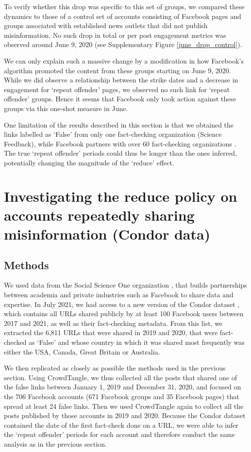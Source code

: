 \documentclass[review]{elsarticle}
\begin{document}
To verify whether this drop was specific to this set of groups, we compared these dynamics to those of a control set of accounts consisting of Facebook pages and groups associated with established news outlets that did not publish misinformation.
No such drop in total or per post engagement metrics was observed around June 9, 2020 (see Supplementary Figure \ref{june_drop_control}).

We can only explain such a massive change by a modification in how Facebook’s algorithm promoted the content from these groups starting on June 9, 2020.
While we did observe a relationship between the strike dates and a decrease in engagement for `repeat offender' pages, we observed no such link for `repeat offender' groups.
Hence it seems that Facebook only took action against these groups via this one-shot measure in June.

One limitation of the results described in this section is that we obtained the links labelled as `False' from only one fact-checking organization (Science Feedback), while Facebook partners with over 60 fact-checking organizations \citep{60factCheckingPartners}.
The true `repeat offender' periods could thus be longer than the ones inferred, potentially changing the magnitude of the ‘reduce’ effect.

\section{Investigating the reduce policy on accounts repeatedly sharing misinformation (Condor data)}

\subsection{Methods}

We used data from the Social Science One organization \cite{king2020new}, that builds partnerships between academia and private industries such as Facebook to share data and expertise. 
In July 2021, we had access to a new version of the Condor dataset \cite{messing2020facebook}, which contains all URLs shared publicly by at least 100 Facebook users between 2017 and 2021, as well as their fact-checking metadata. 
From this list, we extracted the 6,811 URLs that were shared in 2019 and 2020, that were fact-checked as `False' and whose country in which it was shared most frequently was either the USA, Canada, Great Britain or Australia.

We then replicated as closely as possible the methods used in the previous section. 
Using CrowdTangle, we thus collected all the posts that shared one of the false links between January 1, 2019 and December 31, 2020, and focused on the 706 Facebook accounts (671 Facebook groups and 35 Facebook pages) that spread at least 24 false links. 
Then we used CrowdTangle again to collect all the posts published by those accounts in 2019 and 2020. 
Because the Condor dataset contained the date of the first fact-check done on a URL, we were able to infer the `repeat offender' periods for each account and therefore conduct the same analysis as in the previous section.
\end{document}
